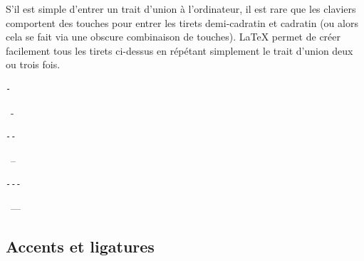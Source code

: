 S'il est simple d'entrer un trait d'union à l'ordinateur, il est rare
que les claviers comportent des touches pour entrer les tirets
demi-cadratin et cadratin (ou alors cela se fait via une obscure
combinaison de touches). {\LaTeX} permet de créer facilement tous les
tirets ci-dessus en répétant simplement le trait d'union deux ou trois
fois.
\begin{demo}
  \begin{minipage}{0.2\linewidth}
    \begin{texample}
\begin{lstlisting}
-
\end{lstlisting}
      \producing\ -
    \end{texample}
  \end{minipage}
  \hfill
  \begin{minipage}{0.2\linewidth}
    \begin{texample}
\begin{lstlisting}
--
\end{lstlisting}
      \producing\ --
    \end{texample}
  \end{minipage}
  \hfill
  \begin{minipage}{0.2\linewidth}
    \begin{texample}
\begin{lstlisting}
---
\end{lstlisting}
      \producing\ ---
    \end{texample}
  \end{minipage}
\end{demo}

\subsection{Accents et ligatures}
\label{sec:bases:caracteres:accents}


